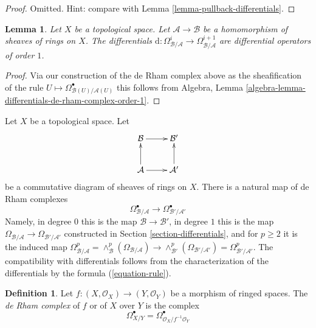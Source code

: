 \documentclass{stacks-project}
\theoremstyle{plain}
\newtheorem{lemma}[subsection]{Lemma}
\theoremstyle{definition}
\newtheorem{definition}[subsection]{Definition}
\theoremstyle{remark}
\numberwithin{equation}{subsection}
\begin{document}
\begin{proof}
Omitted. Hint: compare with Lemma \ref{lemma-pullback-differentials}.
\end{proof}

\begin{lemma}
\label{lemma-differentials-de-rham-complex-order-1}
Let $X$ be a topological space. Let $\mathcal{A} \to \mathcal{B}$
be a homomorphism of sheaves of rings on $X$. The differentials
$\text{d} : \Omega^i_{\mathcal{B}/\mathcal{A}}  \to
\Omega^{i + 1}_{\mathcal{B}/\mathcal{A}}$
are differential operators of order $1$.
\end{lemma}

\begin{proof}
Via our construction of the de Rham complex above as the sheafification
of the rule  $U \mapsto \Omega^\bullet_{\mathcal{B}(U)/\mathcal{A}(U)}$
this follows from
Algebra, Lemma \ref{algebra-lemma-differentials-de-rham-complex-order-1}.
\end{proof}

\noindent
Let $X$ be a topological space. Let
$$
\xymatrix{
\mathcal{B} \ar[r] & \mathcal{B}' \\
\mathcal{A} \ar[r] \ar[u] & \mathcal{A}' \ar[u]
}
$$
be a commutative diagram of sheaves of rings on $X$.
There is a natural map of de Rham complexes
$$
\Omega^\bullet_{\mathcal{B}/\mathcal{A}} \longrightarrow
\Omega^\bullet_{\mathcal{B}'/\mathcal{A}'}
$$
Namely, in degree $0$ this is the map $\mathcal{B} \to \mathcal{B}'$,
in degree $1$ this is the map
$\Omega_{\mathcal{B}/\mathcal{A}} \to \Omega_{\mathcal{B}'/\mathcal{A}'}$
constructed in Section \ref{section-differentials}, and for $p \geq 2$
it is the induced map
$\Omega^p_{\mathcal{B}/\mathcal{A}} =
\wedge^p_\mathcal{B}(\Omega_{\mathcal{B}/\mathcal{A}}) \to
\wedge^p_{\mathcal{B}'}(\Omega_{\mathcal{B}'/\mathcal{A}'}) =
\Omega^p_{\mathcal{B}'/\mathcal{A}'}$.
The compatibility with differentials follows from the characterization
of the differentials by the formula (\ref{equation-rule}).

\begin{definition}
\label{definition-de-rham-complex-morphism-ringed-spaces}
Let $f : (X, \mathcal{O}_X) \to (Y, \mathcal{O}_Y)$ be a morphism
of ringed spaces. The {\it de Rham complex} of $f$ or of $X$ over $Y$
is the complex
$$
\Omega^\bullet_{X/Y} = \Omega^\bullet_{\mathcal{O}_X/f^{-1}\mathcal{O}_Y}
$$
\end{definition}
\end{document}
